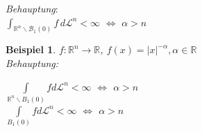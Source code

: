 \documentclass[11pt]{memoir}
\theoremstyle{changebreak}
\newtheorem{Beispiel}{Beispiel}[chapter]
\begin{document}
\par\bigskip
\emph{Behauptung}: \\
$\int_{\mathbb R^n \backslash \mathscr B_1 (0)} f \, d\mathscr L^n < \infty$ $\Leftrightarrow$ $\alpha > n$
\par\bigskip





\begin{Beispiel}
$f: \mathbb R^n \rightarrow \mathbb R$, $f(x) = |x|^{-\alpha}, \alpha \in \mathbb R$ \\
\emph{Behauptung:} 
\begin{center}
	$\int\limits_{\mathbb R^n\backslash B_1(0)} f d\mathscr L^n < \infty$ $\Leftrightarrow$ $\alpha > n$  \\	
	$\int\limits_{B_1(0)} f d\mathscr L^n < \infty$ $\Leftrightarrow$ $\alpha > n$ 
\end{center}


\end{Beispiel}
\end{document}
